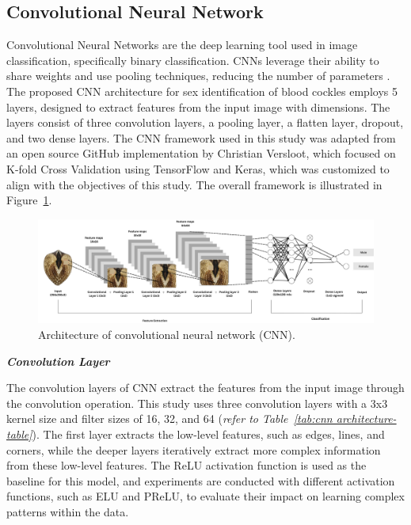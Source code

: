 \newpage
\subsection{Convolutional Neural Network}

Convolutional Neural Networks are the deep learning tool used in image classification, specifically binary classification. CNNs leverage their ability to share weights and use pooling techniques, reducing the number of parameters \cite{cui2020}. The proposed CNN architecture for sex identification of blood cockles employs 5 layers, designed to extract features from the input image with dimensions. The layers consist of three convolution layers, a pooling layer, a flatten layer, dropout, and two dense layers. The CNN framework used in this study was adapted from an open source GitHub implementation by Christian Versloot, which focused on K-fold Cross Validation using TensorFlow and Keras, which was customized to align with the objectives of this study. The overall framework is illustrated in Figure~\ref{fig:cnn_architecture}.

\begin{figure}[h]
	\centering
	\includegraphics[width=\textwidth]{figures/cnn_architecture.png}
	\caption{Architecture of convolutional neural network (CNN).}
	\label{fig:cnn_architecture}
\end{figure}

\textbf{\textit{Convolution Layer}}

The convolution layers of CNN extract the features from the input image through the convolution operation. This study uses three convolution layers with a 3x3 kernel size and filter sizes of 16, 32, and 64 (\textit{refer to Table~\ref{tab:cnn architecture-table}}). The first layer extracts the low-level features, such as edges, lines, and corners, while the deeper layers iteratively extract more complex information from these low-level features. The ReLU activation function is used as the baseline for this model, and experiments are conducted with different activation functions, such as ELU and PReLU, to evaluate their impact on learning complex patterns within the data.

